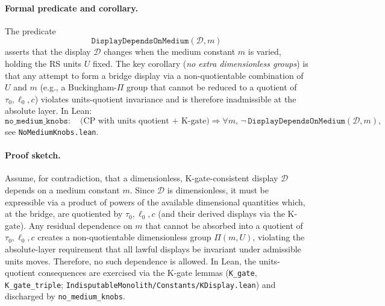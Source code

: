 \documentclass[12pt,a4paper]{article}
\begin{document}
\paragraph{Formal predicate and corollary.}
The predicate
\[
  \texttt{DisplayDependsOnMedium}(\mathcal{D}, m)
\]
asserts that the display \(\mathcal{D}\) changes when the medium constant \(m\) is varied, holding the RS units \(U\) fixed. The key corollary (\emph{no extra dimensionless groups}) is that any attempt to form a bridge display via a non-quotientable combination of \(U\) and \(m\) (e.g., a Buckingham-\(\Pi\) group that cannot be reduced to a quotient of \(\tau_0,\ell_0,c\)) violates units-quotient invariance and is therefore inadmissible at the absolute layer. In Lean:
\[
  \texttt{no\_medium\_knobs} :
  \quad
  \text{(CP with units quotient + K-gate)} \Rightarrow
  \forall m,\, \neg\,\texttt{DisplayDependsOnMedium}(\mathcal{D}, m),
\]
see \texttt{NoMediumKnobs.lean}.

\paragraph{Proof sketch.}
Assume, for contradiction, that a dimensionless, K-gate-consistent display \(\mathcal{D}\) depends on a medium constant \(m\). Since \(\mathcal{D}\) is dimensionless, it must be expressible via a product of powers of the available dimensional quantities which, at the bridge, are quotiented by \(\tau_0,\ell_0,c\) (and their derived displays via the K-gate). Any residual dependence on \(m\) that cannot be absorbed into a quotient of \(\tau_0,\ell_0,c\) creates a non-quotientable dimensionless group \(\Pi(m,U)\), violating the absolute-layer requirement that all lawful displays be invariant under admissible units moves. Therefore, no such dependence is allowed. In Lean, the units-quotient consequences are exercised via the K-gate lemmas (\texttt{K\_gate}, \texttt{K\_gate\_triple}; \texttt{IndisputableMonolith/Constants/KDisplay.lean}) and discharged by \texttt{no\_medium\_knobs}.
\end{document}
